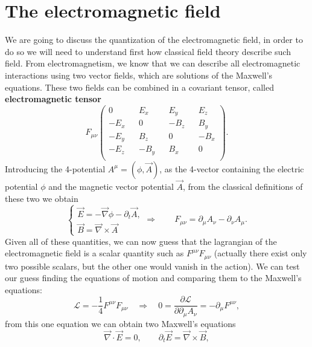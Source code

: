 \section{The electromagnetic field}
We are going to discuss the quantization of the electromagnetic field, in order to do so we will need to understand first how classical field theory describe such field. From electromagnetism, we know that we can describe all electromagnetic interactions using two vector fields, which are solutions of the Maxwell's equations. These two fields can be combined in a covariant tensor, called \textbf{electromagnetic tensor} 
\begin{equation*}
    F_{\mu\nu}\begin{pmatrix}
        0&&E_x&&E_y&&E_z\\
        -E_x&&0&&-B_z&&B_y\\
        -E_y&&B_z&&0&&-B_x\\
        -E_z&&-B_y&&B_x&&0\\
    \end{pmatrix}.
\end{equation*} 
Introducing the 4-potential $A^\mu=(\phi,\vec A)$, as the 4-vector containing the electric potential $\phi$ and the magnetic vector potential $\vec A$, from the classical definitions of these two we obtain
\begin{equation*}
    \begin{cases}
        \vec E=-\vec\nabla\phi-\partial_t\vec A,\\
        \vec B=\vec\nabla \times \vec A
    \end{cases}\Rightarrow\qquad F_{\mu\nu}=\partial_{\mu}A_\nu-\partial_\nu A_\mu.
\end{equation*}
Given all of these quantities, we can now guess that the lagrangian of the electromagnetic field is a scalar quantity such as $F^{\mu\nu}F_{\mu\nu}$ (actually there exist only two possible scalars, but the other one would vanish in the action). We can test our guess finding the equations of motion and comparing them to the Maxwell's equations:
\begin{equation*}
    \mathcal{L} =-\frac{1}{4}F^{\mu\nu}F_{\mu\nu}\quad\Rightarrow\quad0=\frac{\partial\mathcal{L} }{\partial\partial_\mu A_\nu}=-\partial_\mu F^{\mu\nu},
\end{equation*}
from this one equation we can obtain two Maxwell's equations 
\begin{equation*}
    \vec \nabla\cdot\vec E=0,\qquad \partial_{t}\vec E=\vec\nabla\times\vec B,
\end{equation*}
